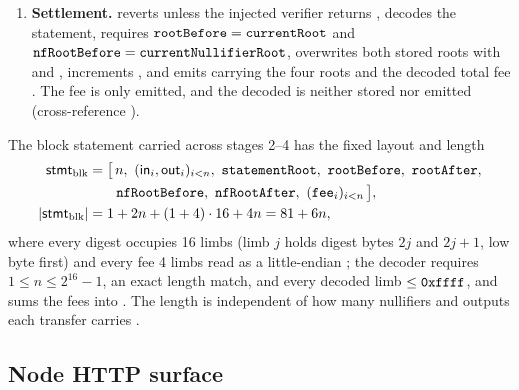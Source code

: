 \begin{enumerate}
  the batch phases and then every WHIR opening round without reseeding
  .
\item \textbf{Settlement.}  reverts unless the
  injected verifier returns , decodes the statement, requires
  $\texttt{rootBefore} = \texttt{currentRoot}$ and
  $\texttt{nfRootBefore} = \texttt{currentNullifierRoot}$, overwrites both stored
  roots with  and , increments
  , and emits  carrying the four roots and
  the decoded total fee . The fee
  is only emitted, and the decoded  is neither stored nor
  emitted (cross-reference ).
\end{enumerate}

The block statement carried across stages 2--4 has the fixed layout and length
\begin{align}
  \mathsf{stmt}_{\mathrm{blk}} &= \bigl[\, n,\ (\mathsf{in}_i, \mathsf{out}_i)_{i<n},\ \code{statementRoot},\ \code{rootBefore},\ \code{rootAfter}, \notag\\
  &\qquad \code{nfRootBefore},\ \code{nfRootAfter},\ (\code{fee}_i)_{i<n} \,\bigr], \\
  |\mathsf{stmt}_{\mathrm{blk}}| &= 1 + 2n + (1+4)\cdot 16 + 4n = 81 + 6n,
\end{align}
where every digest occupies 16 limbs (limb $j$ holds digest bytes $2j$ and
$2j{+}1$, low byte first) and every fee 4 limbs read as a little-endian
; the decoder requires $1 \le n \le 2^{16}-1$, an exact length
match, and every decoded limb $\le \texttt{0xffff}$, and sums the fees into
.
The length is independent of how many nullifiers and outputs each transfer
carries .

\subsection{Node HTTP surface}


